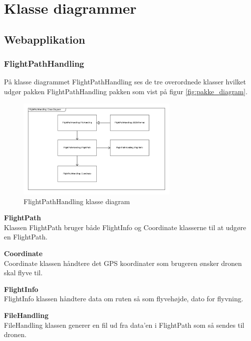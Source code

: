 \section{Klasse diagrammer}

\subsection{Webapplikation}

\subsubsection*{FlightPathHandling}
På klasse diagrammet FlightPathHandling ses de tre overordnede klasser hvilket udgør pakken FlightPathHandling pakken som vist på figur \ref{fig:pakke_diagram}.

\vspace{-5pt}
\begin{figure}[H]
	\centering
	\includegraphics[width=0.7\textwidth]{Billeder/klasse_diagrammer/FlightPathHandlingDiagram.png}
	\vspace{-5pt}
	\caption{FlightPathHandling klasse diagram}
	\label{fig:FlightPathHandling_klasse_diagram}
\end{figure}

\textbf{FlightPath}\\
Klassen FlightPath bruger både FlightInfo og Coordinate klasserne til at udgøre en FlightPath.

\textbf{Coordinate}\\
Coordinate klassen håndtere det GPS koordinater som brugeren ønsker dronen skal flyve til.

\textbf{FlightInfo}\\
FlightInfo klassen håndtere data om ruten så som flyvehøjde, dato for flyvning.

\textbf{FileHandling}\\
FileHandling klassen generer en fil ud fra data'en i FlightPath som så sendes til dronen.

